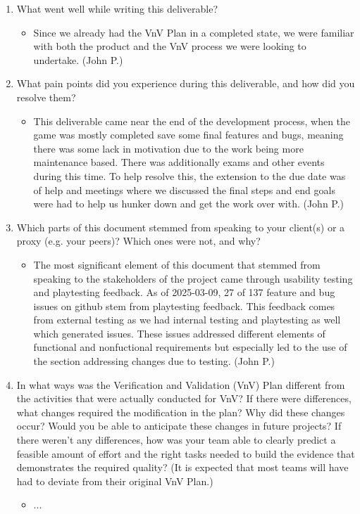 \documentclass[12pt, titlepage]{article}
\begin{document}
\begin{enumerate}
  \item What went well while writing this deliverable?
  
\begin{itemize}
  \item Since we already had the VnV Plan in a completed state, we were familiar with both the product and the VnV process we were looking to undertake. (John P.)
\end{itemize}  
  
  \item What pain points did you experience during this deliverable, and how
    did you resolve them?
    
\begin{itemize}
  \item This deliverable came near the end of the development process, when the game was mostly completed save some final features and bugs, meaning there was some lack in motivation due to the work being more maintenance based. There was additionally exams and other events during this time. To help resolve this, the extension to the due date was of help and meetings where we discussed the final steps and end goals were had to help us hunker down and get the work over with. (John P.)
\end{itemize}    
    
  \item Which parts of this document stemmed from speaking to your client(s) or
  a proxy (e.g. your peers)? Which ones were not, and why?

\begin{itemize}
  \item The most significant element of this document that stemmed from speaking to the stakeholders of the project came through usability testing and playtesting feedback. As of 2025-03-09, 27 of 137 feature and bug issues on github stem from playtesting feedback. This feedback comes from external testing as we had internal testing and playtesting as well which generated issues. These issues addressed different elements of functional and nonfuctional requirements but especially led to the use of the section addressing changes due to testing. (John P.)
\end{itemize}
  
  \item In what ways was the Verification and Validation (VnV) Plan different
  from the activities that were actually conducted for VnV?  If there were
  differences, what changes required the modification in the plan?  Why did
  these changes occur?  Would you be able to anticipate these changes in future
  projects?  If there weren't any differences, how was your team able to clearly
  predict a feasible amount of effort and the right tasks needed to build the
  evidence that demonstrates the required quality?  (It is expected that most
  teams will have had to deviate from their original VnV Plan.)
  
\begin{itemize}
  \item ...
\end{itemize}
  
\end{enumerate}
\end{document}
